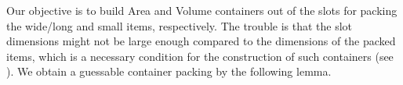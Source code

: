 %     

Our objective is to build Area and Volume containers out of the slots for packing the wide/long and small items, respectively. The trouble is that the slot dimensions might not be large enough compared to the dimensions of the packed items, which is a necessary condition for the construction of such containers (see ). 
We obtain a guessable container packing by the following lemma.



